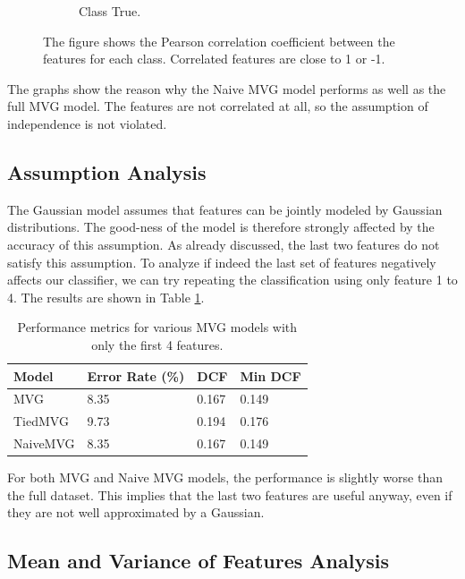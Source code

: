 \documentclass{article}
\begin{document}
\begin{figure}[ht]
\begin{subfigure}[b]{0.45\textwidth}
        \caption{Class True.}
    \end{subfigure}
    \caption{The figure shows the Pearson correlation coefficient between the features for each class. Correlated features are close to 1 or -1.}
    \label{fig:dataset_person}
\end{figure}

The graphs show the reason why the Naive MVG model performs as well as the full MVG model. The features are not correlated at all, so the assumption of independence is not violated. 

\subsection{Assumption Analysis}

The Gaussian model assumes that features can be jointly modeled by Gaussian distributions. The good-ness of the model is therefore strongly affected by the accuracy of this assumption. As already discussed, the last two features do not satisfy this assumption. To analyze if indeed the last set of features negatively affects our classifier, we can try repeating the classification using only feature 1 to 4. The results are shown in Table \ref{tab:mvg_performance_4}.

\begin{table}[ht!]
    \centering
    \begin{tabularx}{\textwidth}{lXXX}
        \toprule
        \textbf{Model} & \textbf{Error Rate (\%)} & \textbf{DCF} & \textbf{Min DCF} \\
        \midrule
        MVG      & 8.35 & 0.167 & 0.149 \\
        TiedMVG  & 9.73 & 0.194 & 0.176 \\
        NaiveMVG & 8.35 & 0.167 & 0.149 \\
        \bottomrule
    \end{tabularx}
    \caption{Performance metrics for various MVG models with only the first 4 features.}
    \label{tab:mvg_performance_4}
\end{table}

For both MVG and Naive MVG models, the performance is slightly worse than the full dataset. This implies that the last two features are useful anyway, even if they are not well approximated by a Gaussian. 

\subsection{Mean and Variance of Features Analysis}
\end{document}
